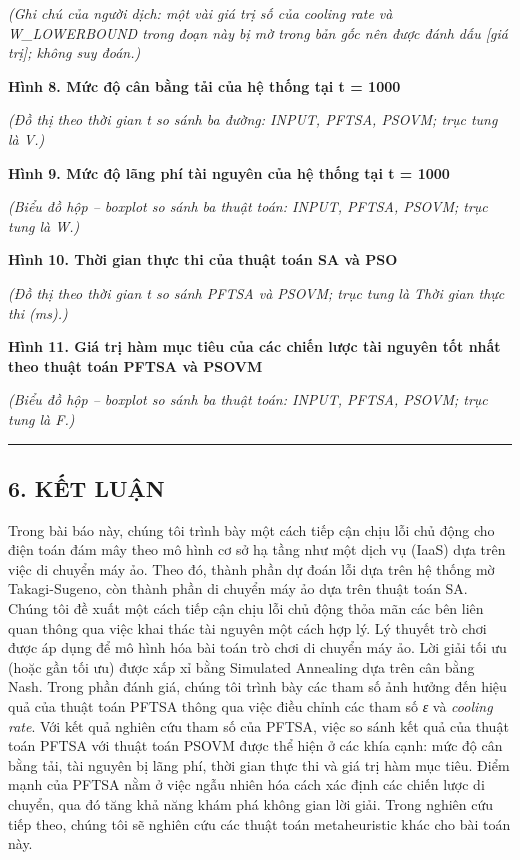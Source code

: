 \documentclass[
  vietnamese,
]{article}
\begin{document}
\emph{(Ghi chú của người dịch: một vài giá trị số của cooling rate và
W\_LOWERBOUND trong đoạn này bị mờ trong bản gốc nên được đánh dấu
{[}giá trị{]}; không suy đoán.)}

\textbf{Hình 8. Mức độ cân bằng tải của hệ thống tại t = 1000}

\emph{(Đồ thị theo thời gian t so sánh ba đường: INPUT, PFTSA, PSOVM;
trục tung là V.)}

\textbf{Hình 9. Mức độ lãng phí tài nguyên của hệ thống tại t = 1000}

\emph{(Biểu đồ hộp -- boxplot so sánh ba thuật toán: INPUT, PFTSA,
PSOVM; trục tung là W.)}

\textbf{Hình 10. Thời gian thực thi của thuật toán SA và PSO}

\emph{(Đồ thị theo thời gian t so sánh PFTSA và PSOVM; trục tung là Thời
gian thực thi (ms).)}

\textbf{Hình 11. Giá trị hàm mục tiêu của các chiến lược tài nguyên tốt
nhất theo thuật toán PFTSA và PSOVM}

\emph{(Biểu đồ hộp -- boxplot so sánh ba thuật toán: INPUT, PFTSA,
PSOVM; trục tung là F.)}

\begin{center}\rule{0.5\linewidth}{0.5pt}\end{center}

\subsection{6. KẾT LUẬN}\label{kux1ebft-luux1eadn}

Trong bài báo này, chúng tôi trình bày một cách tiếp cận chịu lỗi chủ
động cho điện toán đám mây theo mô hình cơ sở hạ tầng như một dịch vụ
(IaaS) dựa trên việc di chuyển máy ảo. Theo đó, thành phần dự đoán lỗi
dựa trên hệ thống mờ Takagi-Sugeno, còn thành phần di chuyển máy ảo dựa
trên thuật toán SA. Chúng tôi đề xuất một cách tiếp cận chịu lỗi chủ
động thỏa mãn các bên liên quan thông qua việc khai thác tài nguyên một
cách hợp lý. Lý thuyết trò chơi được áp dụng để mô hình hóa bài toán trò
chơi di chuyển máy ảo. Lời giải tối ưu (hoặc gần tối ưu) được xấp xỉ
bằng Simulated Annealing dựa trên cân bằng Nash. Trong phần đánh giá,
chúng tôi trình bày các tham số ảnh hưởng đến hiệu quả của thuật toán
PFTSA thông qua việc điều chỉnh các tham số \emph{ε} và \emph{cooling
rate}. Với kết quả nghiên cứu tham số của PFTSA, việc so sánh kết quả
của thuật toán PFTSA với thuật toán PSOVM được thể hiện ở các khía cạnh:
mức độ cân bằng tải, tài nguyên bị lãng phí, thời gian thực thi và giá
trị hàm mục tiêu. Điểm mạnh của PFTSA nằm ở việc ngẫu nhiên hóa cách
xác định các chiến lược di chuyển, qua đó tăng khả năng khám phá không
gian lời giải. Trong nghiên cứu tiếp theo, chúng tôi sẽ nghiên cứu các
thuật toán metaheuristic khác cho bài toán này.
\end{document}
